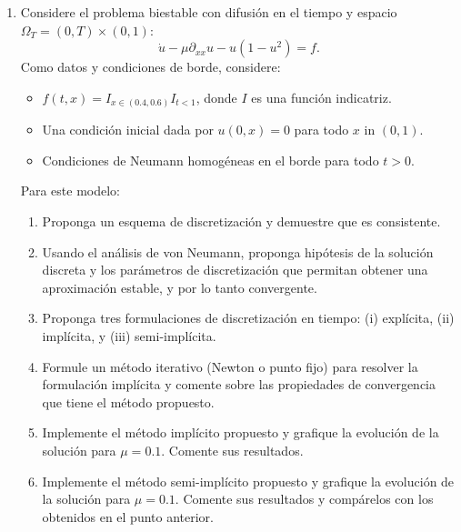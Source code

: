 \documentclass{article}
\newcommand{\pts}[1]{[{\bf #1 puntos}] }
\begin{document}
\begin{enumerate}
    \item Considere el problema biestable con difusión en el tiempo y espacio $\Omega_T = (0,T)\times (0,1)$:
            $$ \dot u - \mu \partial_{xx} u - u(1-u^2) = f. $$
            Como datos y condiciones de borde, considere:
            \begin{itemize}
                \item $f(t,x) = I_{x\in (0.4,0.6)}I_{t<1}$, donde $I$ es una función indicatriz.
                \item Una condición inicial dada por $u(0,x) = 0$ para todo $x$ in $(0,1)$. 
                \item Condiciones de Neumann homogéneas en el borde para todo $t>0$. 
            \end{itemize}
            Para este modelo:
            \begin{enumerate}
                \item\pts{1} Proponga un esquema de discretización y demuestre que es consistente.
                \item\pts{1} Usando el análisis de von Neumann, proponga hipótesis de la solución discreta y los parámetros de discretización que permitan obtener una aproximación estable, y por lo tanto convergente.
                \item\pts{1} Proponga tres formulaciones de discretización en tiempo: (i) explícita, (ii) implícita, y (iii) semi-implícita. 
                \item\pts{1} Formule un método iterativo (Newton o punto fijo) para resolver la formulación implícita y comente sobre las propiedades de convergencia que tiene el método propuesto. 
                \item\pts{3} Implemente el método implícito propuesto y grafique la evolución de la solución para $\mu=0.1$. Comente sus resultados.
                \item\pts{2} Implemente el método semi-implícito propuesto y grafique la evolución de la solución para $\mu=0.1$. Comente sus resultados y compárelos con los obtenidos en el punto anterior.
            \end{enumerate}


\end{enumerate}
\end{document}
